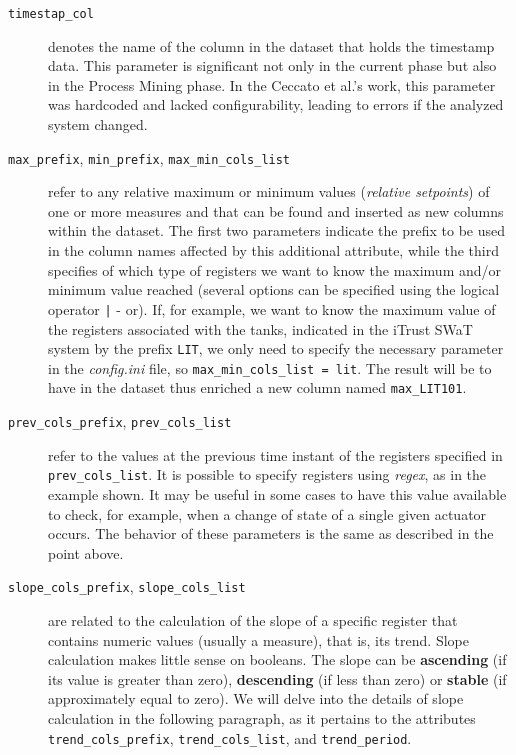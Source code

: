 \begin{description}
	\item[\texttt{timestap\_col}] denotes the name of the column in the dataset that holds the timestamp data. This parameter is significant not only in the current phase but also in the Process Mining phase. In the Ceccato et al.'s work, this parameter was hardcoded and lacked configurability, leading to errors if the analyzed system changed.
	
	\item[\texttt{max\_prefix}, \texttt{min\_prefix}, \texttt{max\_min\_cols\_list}] refer to any relative maximum or minimum values (\textit{relative setpoints}) of one or more measures and that can be found and inserted as new columns within the dataset. The first two parameters indicate the prefix to be used in the column names affected by this additional attribute, while the third specifies of which type of registers we want to know the maximum and/or minimum value reached (several options can be specified using the logical operator \texttt{|} - or).\newline 
	If, for example, we want to know the maximum value of the registers associated with the tanks, indicated in the iTrust SWaT system by the prefix \texttt{LIT}, we only need to specify the necessary parameter in the \textit{config.ini} file, so \texttt{max\_min\_cols\_list = lit}.\newline
	The result will be to have in the dataset thus enriched a new column named \texttt{max\_LIT101}.
	
	\item[\texttt{prev\_cols\_prefix}, \texttt{prev\_cols\_list}]  refer to the values at the previous time instant of the registers specified in \texttt{prev\_cols\_list}. It is possible to specify registers using \textit{regex}, as in the example shown. It may be useful in some cases to have this value available to check, for example, when a change of state of a single given actuator occurs.  The behavior of these parameters is the same as described in the point above.
	
	\item[\texttt{slope\_cols\_prefix}, \texttt{slope\_cols\_list}] are related to the calculation of the slope of a specific register that contains numeric values (usually a measure), that is, its trend. Slope calculation makes little sense on booleans. The slope can be \textbf{ascending} (if its value is greater than zero), \textbf{descending} (if less than zero) or \textbf{stable} (if approximately equal to zero). We will delve into the details of slope calculation in the following paragraph, as it pertains to the attributes \texttt{trend\_cols\_prefix}, \texttt{trend\_cols\_list}, and \texttt{trend\_period}.
\end{description}


